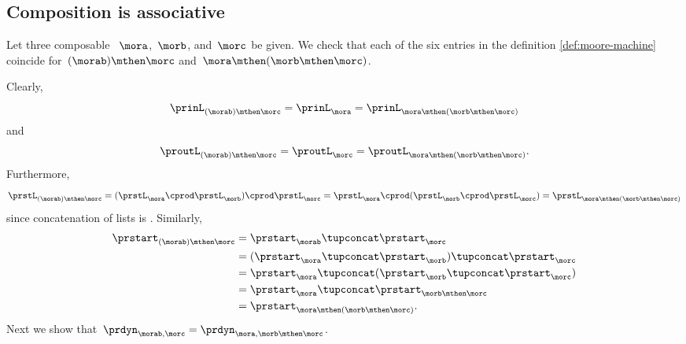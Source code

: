 \subsection{Composition is associative}

Let three composable ~$\mora$,~$\morb$, and~$\morc$ be given.
We check that each of the six entries in the definition \cref{def:moore-machine} coincide for~$(\morab) \mthen \morc$ and~$\mora \mthen (\morb \mthen \morc)$.

Clearly,
\begin{equation}
    \label{eq:moore_assoc_input}
    \prinL_{(\morab)\mthen \morc} = \prinL_{\mora} =\prinL_{\mora \mthen (\morb \mthen \morc)}
\end{equation}
and
\begin{equation}
    \label{eq:moore_assoc_output}
    \proutL_{(\morab)\mthen \morc} =\proutL_\morc = \proutL_{\mora \mthen (\morb \mthen \morc)}.
\end{equation}
Furthermore,
\begin{equation}
    \label{eq:moore_assoc_state}
    \prstL_{(\morab)\mthen \morc} = (\prstL_{\mora} \cprod \prstL_{\morb}) \cprod \prstL_{\morc} = \prstL_{\mora} \cprod (\prstL_{\morb} \cprod \prstL_{\morc}) =\prstL_{\mora \mthen (\morb \mthen \morc)}
\end{equation}
since concatenation of lists is .
Similarly,
\begin{equation}
    \label{eq:moore_assoc_start}
    \begin{aligned}
        \prstart_{(\morab)\mthen \morc} & = \prstart_{\morab} \tupconcat \prstart_{\morc} \\
                                        & = (\prstart_{\mora } \tupconcat \prstart_{\morb}) \tupconcat \prstart_{\morc} \\
                                        & = \prstart_{\mora } \tupconcat (\prstart_{\morb} \tupconcat \prstart_{\morc}) \\
                                        & = \prstart_{\mora } \tupconcat \prstart_{ \morb \mthen\morc} \\
                                        & = \prstart_{\mora \mthen (\morb \mthen \morc)}.
    \end{aligned}
\end{equation}
Next we show that~$\prdyn_{\morab, \morc} = \prdyn_{\mora, \morb \mthen \morc}$.

